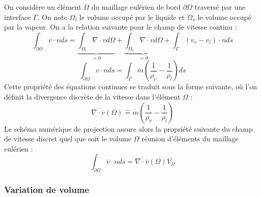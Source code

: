 On considère un \'el\'ement $\Omega$ du maillage eul\'erien de bord $\partial\Omega$ travers\'e par une interface $\Gamma$. On note $\Omega_{l}$ le volume occup\'e par le liquide et $\Omega_{v}$ le volume occup\'e par la vapeur. On a la relation suivante pour le champ de vitesse continu :
\begin{equation}
\int_{\partial\Omega} v \cdot n ds = \underbrace{\int_{\Omega_{l}} \nabla \cdot v d\Omega}_{=0} + \underbrace{\int_{\Omega_{v}} \nabla \cdot v d\Omega}_{=0} + \int_{\Gamma} (v_{v} - v_{l}) \cdot n ds
\end{equation}
\begin{equation}
\int_{\partial\Omega} v \cdot n ds = \int_{\Gamma} \dot{m} \left( \dfrac{1}{\rho_{v}} - \dfrac{1}{\rho_{l}}\right) ds
\end{equation}
Cette propri\'et\'e des \'equations continues se traduit sous la forme suivante, où l’on d\'efinit la divergence discrète de la vitesse dans l’\'el\'ement $\Omega$ :
\begin{equation}
\overline{\nabla \cdot \overline{v}}(\Omega) \hat{=} \overline{\dot{m}} \left( \dfrac{1}{\rho_{v}} - \dfrac{1}{\rho_{l}}\right) \label{eq:FTIJK_divV}
\end{equation}
Le sch\'ema num\'erique de projection assure alors la propri\'et\'e suivante du
champ de vitesse discret quel que soit le volume $\Omega$ r\'eunion d’\'el\'ements du maillage eul\'erien :
\begin{equation}
\int_{\partial\Omega} \overline{v} \cdot n ds =\overline{\nabla \cdot \overline{v}}(\Omega) \overline{V_{\Omega}} \label{eq:FTIJK_bilanMasse}
\end{equation}

\subsubsection{Variation de volume}

